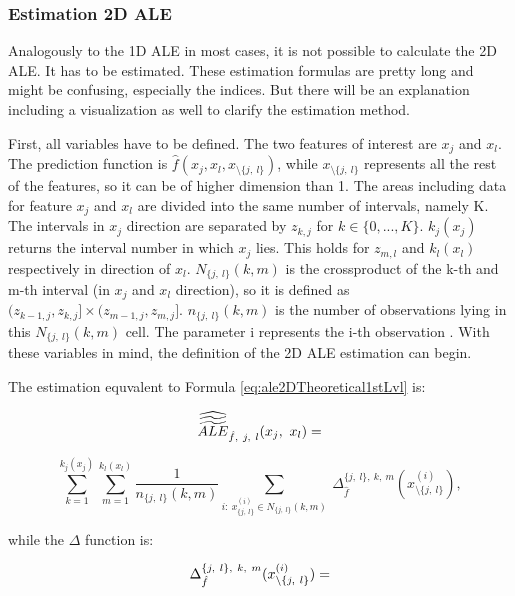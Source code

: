 \documentclass[]{krantz}
\begin{document}
\subsubsection{Estimation 2D ALE}\label{estimation-2d-ale}

Analogously to the 1D ALE in most cases, it is not possible to calculate
the 2D ALE. It has to be estimated. These estimation formulas are pretty
long and might be confusing, especially the indices. But there will be
an explanation including a visualization as well to clarify the
estimation method.

First, all variables have to be defined. The two features of interest
are \(x_j\) and \(x_l\). The prediction function is
\(\hat{f}(x_j, x_l, x_{\setminus\{j,~l\}})\), while
\(x_{\setminus\{j,~l\}}\) represents all the rest of the features, so it
can be of higher dimension than 1. The areas including data for feature
\(x_j\) and \(x_l\) are divided into the same number of intervals,
namely K. The intervals in \(x_j\) direction are separated by
\(z_{k,j}\) for \(k \in \{0,...,K\}\). \(k_j(x_j)\) returns the interval
number in which \(x_j\) lies. This holds for \(z_{m,l}\) and
\(k_l(x_l)\) respectively in direction of \(x_l\). \(N_{\{j,~l\}}(k,m)\)
is the crossproduct of the k-th and m-th interval (in \(x_j\) and
\(x_l\) direction), so it is defined as
\((z_{k-1,j}, z_{k,j}] \times (z_{m-1,j}, z_{m,j}]\).
\(n_{\{j,~l\}}(k,m)\) is the number of observations lying in this
\(N_{\{j,~l\}}(k,m)\) cell. The parameter i represents the i-th
observation \citep{Apley2016}. With these variables in mind, the
definition of the 2D ALE estimation can begin.

The estimation equvalent to Formula \eqref{eq:ale2DTheoretical1stLvl} is:

\begin{equation} 
\widehat{\widetilde{\widetilde{ALE}}}_{\hat{f},~j,~l}(x_j, ~x_l) = \notag
\end{equation}

\begin{equation}
\sum_{k=1}^{k_j(x_j)} \sum_{m=1}^{k_l(x_l)}   \frac{1}{n_{\{j,~l\}}(k,m)}\sum_{i:~x_{\{j,~l\}}^{(i)}\in N_{\{j,~l\}}(k,m)} ~ \Delta_{\hat f}^{{\{j,~l\}}, ~k,~m} (x_{\setminus\{j,~l\}}^{(i)}),
  \label{eq:ale2DEst1stLvl}
\end{equation}

while the \(\Delta\) function is:

\begin{equation}
\Delta_{\hat f}^{{\{j,~l\}}, ~k,~m} (x_{\setminus\{j,~l\}}^{(i)}) = \notag
\end{equation}
\end{document}

